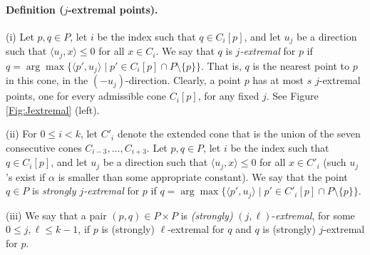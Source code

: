 \documentclass[letter,11pt]{article}
\def\inprod#1#2{\langle #1, #2\rangle}
\begin{document}
\paragraph{Definition ($j$-extremal points).}
(i) Let $p,q\in P$, let $i$ be the index such that $q\in C_i[p]$,
and let $u_j$ be a direction
 such that
  $\inprod{u_j}{x}\le 0$ for all $x\in C_i$.
We say that $q$ is \emph{$j$-extremal} for $p$ if 
  $q = \arg\max \{\inprod{p'}{u_j}\mid p'\in C_i[p]\cap P\setminus\{p\}\}$.
That is, $q$ is the nearest point to $p$ in this cone, in the $(-u_j)$-direction.
Clearly, a point $p$ has at most $s$ $j$-extremal points,
one for every admissible cone $C_i[p]$, for any fixed $j$. See Figure \ref{Fig:Jextremal} (left).

(ii) For $0\leq i< k$, let $C'_i$ denote the extended cone that
is the union of the seven consecutive cones $C_{i-3},\ldots,
C_{i+3}$. 
Let $p,q\in P$, let $i$ be the index such that $q\in C_i[p]$,
and let $u_j$ be a direction
such that 
 $\inprod{u_j}{x}\le 0$ for all $x\in C'_i$ (such $u_j$'s exist if $\alpha$ is smaller than some appropriate constant).
We say that the point $q\in P$ is \textit{strongly $j$-extremal} for $p$
if $q = \arg\max \{\inprod{p'}{u_j}\mid p'\in C'_i[p]\cap P\setminus\{p\}\}$. 

(iii) We say that a pair $(p,q)\in P\times P$ is {\it (strongly)} $(j,\ell)$-{\it extremal}, for some $0\leq j,\ell \leq k-1$, if $p$ is (strongly) $\ell$-extremal for
$q$ and $q$ is (strongly) $j$-extremal for $p$.
\end{document}
